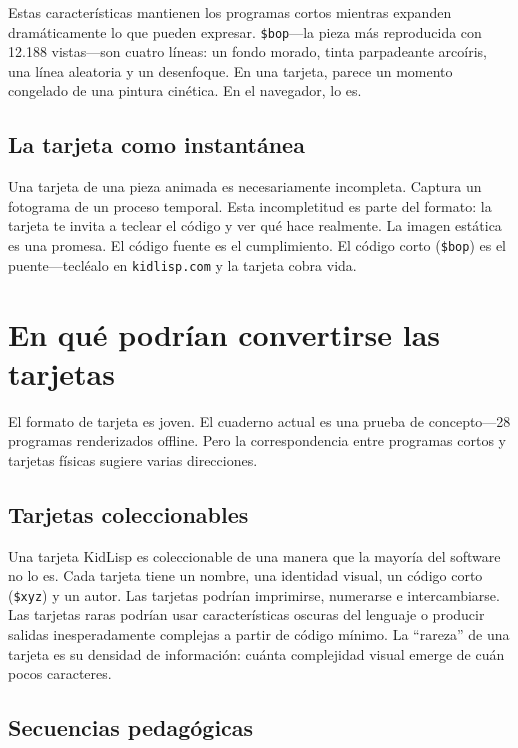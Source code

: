 \documentclass[10pt,letterpaper,twocolumn]{article}
\begin{document}
Estas caracter\'isticas mantienen los programas cortos mientras expanden dram\'aticamente lo que pueden expresar. \texttt{\$bop}---la pieza m\'as reproducida con 12.188 vistas---son cuatro l\'ineas: un fondo morado, tinta parpadeante arco\'iris, una l\'inea aleatoria y un desenfoque. En una tarjeta, parece un momento congelado de una pintura cin\'etica. En el navegador, lo es.

\subsection{La tarjeta como instant\'anea}

Una tarjeta de una pieza animada es necesariamente incompleta. Captura un fotograma de un proceso temporal. Esta incompletitud es parte del formato: la tarjeta te invita a teclear el c\'odigo y ver qu\'e hace realmente. La imagen est\'atica es una promesa. El c\'odigo fuente es el cumplimiento. El c\'odigo corto (\texttt{\$bop}) es el puente---tecl\'ealo en \texttt{kidlisp.com} y la tarjeta cobra vida.


\section{En qu\'e podr\'ian convertirse las tarjetas}
\label{sec:futures}

El formato de tarjeta es joven. El cuaderno actual es una prueba de concepto---28 programas renderizados offline. Pero la correspondencia entre programas cortos y tarjetas f\'isicas sugiere varias direcciones.

\subsection{Tarjetas coleccionables}

Una tarjeta KidLisp es coleccionable de una manera que la mayor\'ia del software no lo es. Cada tarjeta tiene un nombre, una identidad visual, un c\'odigo corto (\texttt{\$xyz}) y un autor. Las tarjetas podr\'ian imprimirse, numerarse e intercambiarse. Las tarjetas raras podr\'ian usar caracter\'isticas oscuras del lenguaje o producir salidas inesperadamente complejas a partir de c\'odigo m\'inimo. La ``rareza'' de una tarjeta es su densidad de informaci\'on: cu\'anta complejidad visual emerge de cu\'an pocos caracteres.

\subsection{Secuencias pedag\'ogicas}
\end{document}
